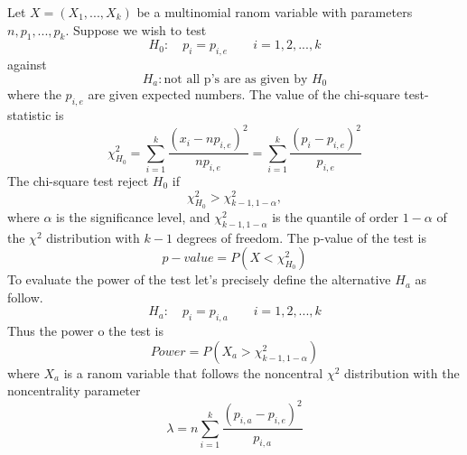 \documentclass{article}
\begin{document}
Let $X=(X_1, ..., X_k)$ be a multinomial ranom variable with parameters
$n, p_1, ..., p_k$. Suppose we wish to test
\begin{equation}
    H_0: \quad p_i=p_{i,e} \qquad i =1,2,...,k
\end{equation}
against
\begin{equation}
    H_a: \mbox{not all p's are as given by } H_0
\end{equation}
where the $p_{i,e}$ are given expected numbers. The value of the chi-square test-statistic is
\begin{equation}
    \chi^2_{H_0} = \sum_{i=1}^k \frac{\left(x_i - np_{i,e}\right)^2}{np_{i,e}} = \sum_{i=1}^k \frac{\left(p_i - p_{i,e}\right)^2}{p_{i,e}}
\end{equation}
The chi-square test reject $H_0$ if
\begin{equation}
    \chi^2_{H_0} > \chi^2_{k-1,1-\alpha},
\end{equation}
where $\alpha$ is the significance level, and $\chi^2_{k-1,1-\alpha}$ is the 
quantile of order $1-\alpha$ of the $\chi^2$ distribution with $k-1$ degrees of
freedom.
The p-value of the test is
\begin{equation}
    p-value = P\left(X<\chi^2_{H_0}\right)
\end{equation}
To evaluate the power of the test let's precisely define the alternative $H_a$ as follow.
\begin{equation}
    H_a: \quad p_i=p_{i,a} \qquad i =1,2,...,k
\end{equation}
Thus the power o the test is
\begin{equation}
    Power = P\left(X_a > \chi^2_{k-1,1-\alpha}\right)
\end{equation}
where $X_a$ is a ranom variable that follows the noncentral $\chi^2$ distribution with the noncentrality parameter
\begin{equation}
    \lambda = n \sum_{i=1}^k \frac{\left(p_{i,a}-p_{i,e}\right)^2}{p_{i,a}}
\end{equation}
\end{document}
